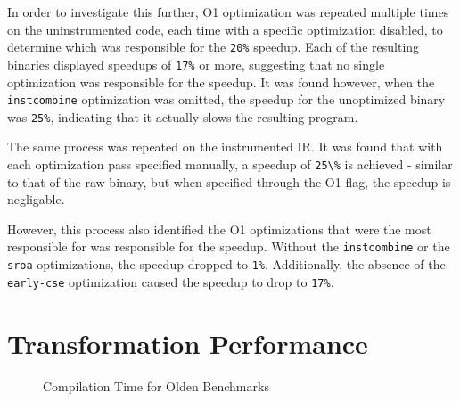 In order to investigate this further, O1 optimization was repeated multiple times on the uninstrumented code, each time with a specific optimization disabled, to determine which was responsible for the \verb!20%! speedup.
Each of the resulting binaries displayed speedups of \verb!17%! or more, suggesting that no single optimization was responsible for the speedup.
It was found however, when the \verb!instcombine! optimization was omitted, the speedup for the unoptimized binary was \verb!25%!, indicating that it actually slows the resulting program.

The same process was repeated on the instrumented IR.
It was found that with each optimization pass specified manually, a speedup of \verb!25\%! is achieved - similar to that of the raw binary, but when specified through the O1 flag, the speedup is negligable.

However, this process also identified the O1 optimizations that were the most responsible for was responsible for the speedup.
Without the \verb!instcombine! or the \verb!sroa! optimizations, the speedup dropped to \verb!1%!.
Additionally, the absence of the \verb!early-cse! optimization caused the speedup to drop to \verb!17%!.


\section{Transformation Performance}

\begin{figure}
\centering
{}
\caption{Compilation Time for Olden Benchmarks}
\label{fig:CompTime}
\end{figure}

